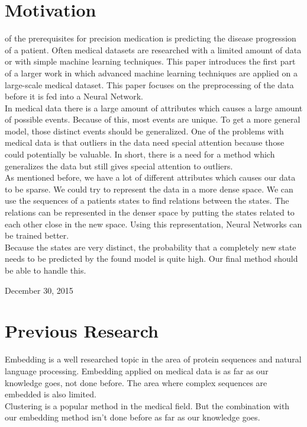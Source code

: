 \documentclass[journal]{IEEETemplate/IEEEtran}
\begin{document}
%
\IEEEpeerreviewmaketitle



\section{Motivation}

 of the prerequisites for precision medication is predicting the disease progression of a patient. Often medical datasets are researched with a limited amount of data or with simple machine learning techniques. This paper introduces the first part of a larger work in which advanced machine learning techniques are applied on a large-scale medical dataset. This paper focuses on the preprocessing of the data before it is fed into a Neural Network. \\
In medical data there is a large amount of attributes which causes a large amount of possible events. Because of this, most events are unique. To get a more general model, those distinct events should be generalized. One of the problems with medical data is that outliers in the data need special attention because those could potentially be valuable. In short, there is a need for a method which generalizes the data but still gives special attention to outliers. \\
As mentioned before, we have a lot of different attributes which causes our data to be sparse. We could try to represent the data in a more dense space. We can use the sequences of a patients states to find relations between the states. The relations can be represented in the denser space by putting the states related to each other close in the new space. Using this representation, Neural Networks can be trained better. \\
Because the states are very distinct, the probability that a completely new state needs to be predicted by the found model is quite high. Our final method should be able to handle this.
 
\hfill December 30, 2015



\section{Previous Research}
Embedding is a well researched topic in the area of protein sequences\cite{1,2} and natural language processing\cite{3,4}. Embedding applied on medical data is as far as our knowledge goes, not done before. The area where complex sequences are embedded is also limited. \\
Clustering is a popular method in the medical field\cite{5,6}. But the combination with our embedding method isn't done before as far as our knowledge goes. \\
\end{document}

